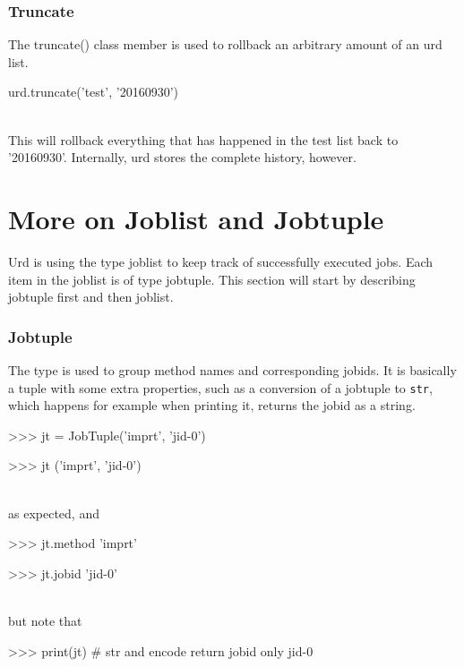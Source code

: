 \subsubsection{Truncate}

The truncate() class member is used to rollback an arbitrary amount of
an urd list.

\begin{python}
  urd.truncate('test', '20160930')
\end{python}
\\
This will rollback everything that has happened in the test list back
to '20160930'.  Internally, urd stores the complete history, however.



\newpage
\section{More on Joblist and Jobtuple}

Urd is using the type joblist to keep track of successfully executed
jobs.  Each item in the joblist is of type jobtuple.  This section
will start by describing jobtuple first and then joblist.

\subsubsection{Jobtuple}

The \jobtuple type is used to group method names and corresponding
jobids.  It is basically a tuple with some extra properties, such as a
conversion of a jobtuple to \texttt{str}, which happens for example
when printing it, returns the jobid as a string.

\begin{pythonBEG}
>>> jt = JobTuple('imprt', 'jid-0')

>>> jt
('imprt', 'jid-0')
\end{pythonBEG}
\\
as expected, and

\begin{pythonMID}
>>> jt.method
'imprt'

>>> jt.jobid
'jid-0'
\end{pythonMID}
\\
but note that

\begin{pythonEND}
>>> print(jt)  # str and encode return jobid only
jid-0
\end{pythonEND}



